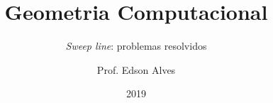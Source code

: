 \title{Geometria Computacional}
\subtitle{\textit{Sweep line}: problemas resolvidos}
\date{2019}
\author{Prof. Edson Alves}
